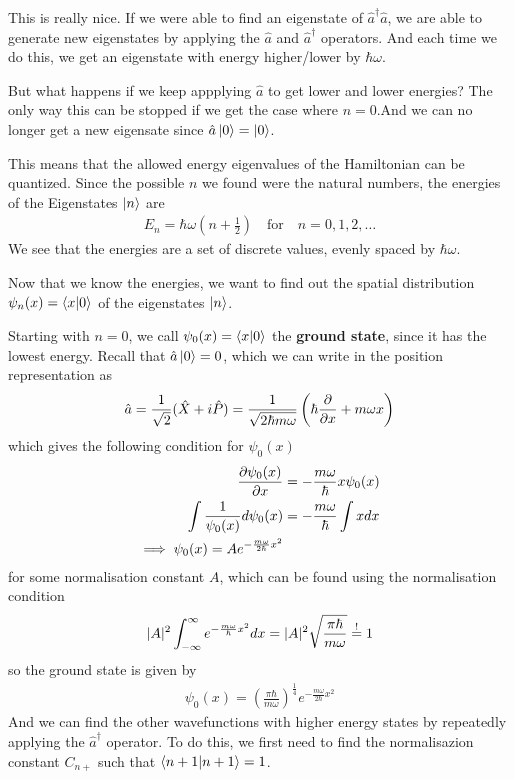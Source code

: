 This is really nice. If we were able to find an eigenstate of $\hat{a}^{\dagger}\hat{a}$, we are able to generate new eigenstates by applying the $\hat{a}$ and $\hat{a}^{\dagger}$ operators.
And each time we do this, we get an eigenstate with energy higher/lower by $\hbar \omega$.

But what happens if we keep appplying $\hat{a}$ to get lower and lower energies? The only way this can be stopped if we get the case where $n = 0$.And we can no longer get a new eigensate since $\hat{a} \ket{0} = \ket{0}$.

This means that the allowed energy eigenvalues of the Hamiltonian can be quantized. Since the possible $n$ we found were the natural numbers, the energies of the Eigenstates $\ket{n}$ are
\begin{align*}
	E_n = \hbar \omega \left(
		n + \frac{1}{2}
	\right)
	\quad \text{for} \quad n = 0, 1, 2, \ldots	
\end{align*}
We see that the energies are a set of discrete values, evenly spaced by $\hbar \omega$. 

Now that we know the energies, we want to find out the spatial distribution $\psi_n(x) = \braket{x|0}$ of the eigenstates $\ket{n}$.

Starting with $n = 0$, we call $\psi_0(x) = \braket{x|0}$ the \textbf{ground state}, since it has the lowest energy.
Recall that $\hat{a} \ket{0} = 0$, which we can write in the position representation as
\begin{align*}
	\hat{a} = \frac{1}{\sqrt{2}}(\hat{X} + i \hat{P}) = \frac{1}{\sqrt{2 \hbar m \omega}} \left(
		\hbar \frac{\partial }{\partial x} + m \omega x
	\right)
\end{align*}
which gives the following condition for $\psi_0(x)$
\begin{align*}
	\frac{\partial \psi_0(x)}{\partial x} &= - \frac{m \omega}{\hbar} x \psi_0(x)\\
	\int \frac{1}{\psi_0(x)}d \psi_0(x) &= - \frac{m \omega}{\hbar} \int x dx\\
	\implies \psi_0(x) = A e^{- \frac{m \omega}{2 \hbar}x^2}
\end{align*}
for some normalisation constant $A$, which can be found using the normalisation condition
\begin{align*}
	\vert A\vert^{2} \int_{-\infty}^{\infty} e^{-\frac{m \omega}{\hbar}x^{2}}dx = \vert A\vert^2 \sqrt{\frac{\pi \hbar}{m \omega}} \stackrel{!}{=} 1
\end{align*}
so the ground state is given by
\begin{align*}
	\psi_0(x) = \left(
		\frac{
			\pi \hbar
		}{
			m \omega
		} 
	\right)^{\frac{1}{4}}
	e^{
		-\frac{m \omega}{2 \hbar}x^{2}
	}
\end{align*}
And we can find the other wavefunctions with higher energy states by repeatedly applying the $\hat{a}^{\dagger}$ operator. 
To do this, we first need to find the normalisazion constant $C_{n+}$ such that $\braket{n+1|n+1} = 1$.

